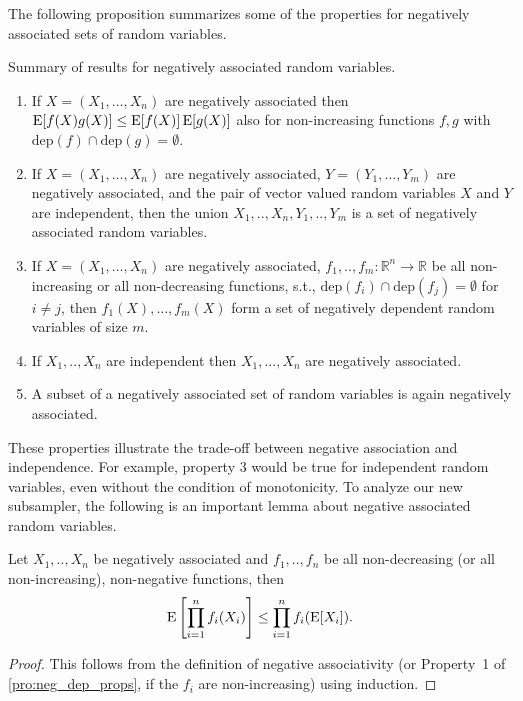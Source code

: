 The following proposition summarizes some of the properties for negatively associated sets of random variables.
\begin{proposition}\label{pro:neg_dep_props}
Summary of results for negatively associated random variables.
\begin{enumerate}
\item \label{it:neg_dep_props:mult_mono} If $X=(X_1,\ldots,X_n)$ are negatively associated then $\operatorname{\mathrm{E}} [f(X) g(X)] \leq \operatorname{\mathrm{E}} [f(X)] \operatorname{\mathrm{E}} [g(X)]$ also for non-increasing functions $f,g$ with $\mathrm{dep}(f) \cap \mathrm{dep}(g) = \emptyset$.
\item If $X=(X_1,\ldots,X_n)$ are negatively associated, $Y=(Y_1,\ldots,Y_m)$ are negatively associated, and the pair of vector valued random variables $X$ and $Y$ are independent, then the union $X_1,..,X_n,Y_1,..,Y_m$ is a set of negatively associated random variables.
\item If $X=(X_1,\ldots,X_n)$ are negatively associated, $f_1,..,f_m : \mathbb R^n \rightarrow \mathbb R$ be all non-increasing or all non-decreasing functions, s.t., $\mathrm{dep}(f_i) \cap \mathrm{dep}(f_j) = \emptyset$ for $i \neq j$, then $f_1(X),\ldots,f_m(X)$ form a set of negatively dependent random variables of size $m$.
\item If $X_1,..,X_n$ are independent then $X_1,...,X_n$ are negatively associated.
\item A subset of a negatively associated set of random variables is again negatively associated.
\end{enumerate}
\end{proposition}

These properties illustrate the trade-off between negative association and independence.
For example, property 3 would be true for independent random variables, even without the condition of monotonicity.
To analyze our new subsampler, the following is an important lemma about negative associated random variables.

\begin{lemma}\label{le:neg_assoc_prod}
Let $X_1,..,X_n$ be negatively associated and $f_1,..,f_n$ be all non-decreasing (or all non-increasing), non-negative functions, then
\[
  \operatorname{\mathrm{E}} \left[\prod_{i=1}^{n} f_i(X_i)\right] \leq \prod_{i=1}^{n} f_i(\operatorname{\mathrm{E}} [X_i]) \textrm{.}
\]
\end{lemma}
\begin{proof}
This follows from the definition of negative associativity (or Property~1 of \cref{pro:neg_dep_props}, if the $f_i$ are non-increasing) using induction.
\end{proof}

